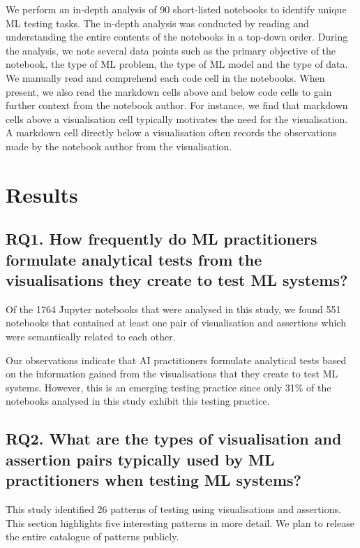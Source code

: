\documentclass[conference]{IEEEtran}
\begin{document}
We perform an in-depth analysis of 90 short-listed notebooks to identify unique ML testing tasks. The in-depth analysis was conducted by reading and understanding the entire contents of the notebooks in a top-down order. During the analysis, we note several data points such as the primary objective of the notebook, the type of ML problem, the type of ML model and the type of data. We manually read and comprehend each code cell in the notebooks. When present, we also read the markdown cells above and below code cells to gain further context from the notebook author. For instance, we find that markdown cells above a visualisation cell typically motivates the need for the visualisation. A markdown cell directly below a visualisation often records the observations made by the notebook author from the visualisation.

\section{Results}\label{sec:result}
\subsection{RQ1. How frequently do ML practitioners formulate analytical tests from the visualisations they create to test ML systems?}\label{sec:result-rq1}

Of the 1764 Jupyter notebooks that were analysed in this study, we found 551 notebooks that contained at least one pair of visualisation and assertions which were semantically related to each other.

Our observations indicate that AI practitioners formulate analytical tests based on the information gained from the visualisations that they create to test ML systems. However, this is an emerging testing practice since only 31\% of the notebooks analysed in this study exhibit this testing practice.

\subsection{RQ2. What are the types of visualisation and assertion pairs typically used by ML practitioners when testing ML systems?}\label{sec:result-rq2}

This study identified 26 patterns of testing using visualisations and assertions. This section highlights five interesting patterns in more detail. We plan to release the entire catalogue of patterns publicly.
\end{document}

